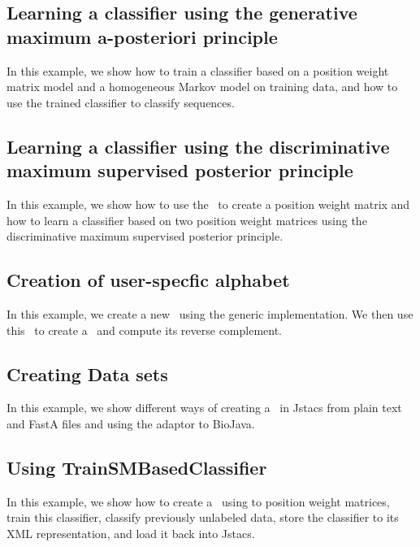 \subsection{Learning a classifier using the generative maximum a-posteriori principle}
In this example, we show how to train a classifier based on a position weight matrix model and a homogeneous Markov model on training data, and how to use the trained classifier to classify sequences.
\renewcommand{\codefile}{./recipes/TrainClassifier.java}
\setcounter{off}{40}

\subsection{Learning a classifier using the discriminative maximum supervised posterior principle}
In this example, we show how to use the \DiffSMFactory~to create a position weight matrix and how to learn a classifier based on two position weight matrices using the discriminative maximum supervised posterior principle.
\renewcommand{\codefile}{./recipes/CreateMSPClassifier.java}
\setcounter{off}{42}

\subsection{Creation of user-specfic alphabet}
In this example, we create a new \ComplementableDiscreteAlphabet~using the generic implementation. We then use this \Alphabet~to create a \Sequence~and compute its reverse complement.
\renewcommand{\codefile}{./recipes/AlphabetCreation.java}
\setcounter{off}{33}

\subsection{Creating Data sets}
In this example, we show different ways of creating a \DataSet~in Jstacs from plain text and FastA files and using the adaptor to BioJava.
\renewcommand{\codefile}{./recipes/DataLoader.java}
\setcounter{off}{42}

\subsection{Using TrainSMBasedClassifier}
In this example, we show how to create a \TrainSMBasedClassifier~using to position weight matrices, train this classifier, classify previously unlabeled data, store the classifier to its XML representation, and load it back into Jstacs.
\renewcommand{\codefile}{./recipes/TrainSMBasedClassifierTest.java}
\setcounter{off}{53}

